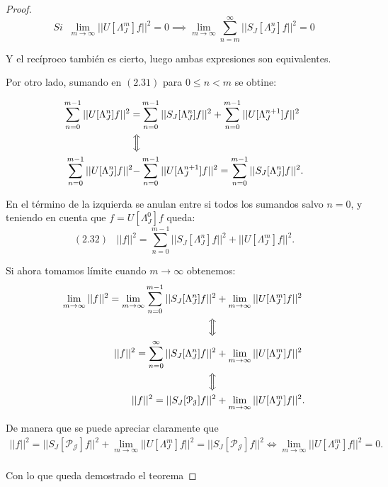 \begin{proof}
  $$Si \; \; \lim_{m\rightarrow \infty} ||U[\Lambda_J^m]f||^2=0 \implies \lim_{m\rightarrow\infty} \sum_{n=m}^{\infty} ||S_J[\Lambda_J^n]f||^2=0$$

  \noindent Y el recíproco también es cierto, luego ambas expresiones son equivalentes.

  \medskip

  \noindent Por otro lado, sumando en $(2.31)$ para $0\leq n < m$ se obtine:

  \begin{align*}
    \sum_{n=0}^{m-1} ||U[\Lambda_J^n]f||^2=&\sum_{n=0}^{m-1} ||S_J[\Lambda_J^n]f||^2 +\sum_{n=0}^{m-1}||U[\Lambda_J^{n+1}]f||^2 \\
    \Big\Updownarrow \\
    \sum_{n=0}^{m-1} ||U[\Lambda_J^n]f||^2 -& \sum_{n=0}^{m-1}||U[\Lambda_J^{n+1}]f||^2 = \sum_{n=0}^{m-1} ||S_J[\Lambda_J^n]f||^2.  \\
  \end{align*}
  
  \noindent En el término de la izquierda se anulan entre si todos los sumandos salvo $n=0$, y teniendo en cuenta que $f=U[\Lambda_J^0]f$ queda:
  $$(2.32) \;\;\; ||f||^2=\sum_{n=0}^{m-1} ||S_J[\Lambda_J^n]f||^2 + ||U[\Lambda_J^m]f||^2.$$

  \noindent Si ahora tomamos límite cuando $m\rightarrow \infty$ obtenemos: 
  \begin{align*}
    \lim_{m\rightarrow \infty}||f||^2 =\lim_{m\rightarrow \infty}\sum_{n=0}^{m-1} ||S_J[\Lambda_J^n]f||^2 &+ \lim_{m\rightarrow \infty} ||U[\Lambda_J^m]f||^2  \\
    \Big\Updownarrow \\
    ||f||^2 =\sum_{n=0}^{\infty} ||S_J[\Lambda_J^n]f||^2 &+ \lim_{m\rightarrow \infty} ||U[\Lambda_J^m]f||^2  \\
    \Big\Updownarrow \\
    ||f||^2 =||S_J[\mathcal{P_J}]f||^2 &+ \lim_{m\rightarrow \infty} ||U[\Lambda_J^m]f||^2.  \\
  \end{align*}

  \noindent De manera que se puede apreciar claramente que  
  \begin{align*}
    ||f||^2 =||S_J[\mathcal{P_J}]f||^2 + \lim_{m\rightarrow \infty} ||U[\Lambda_J^m]f||^2  = ||S_J[\mathcal{P_J}]f||^2 \iff \lim_{m\rightarrow \infty} ||U[\Lambda_J^m]f||^2=0. \\
  \end{align*}

  \noindent Con lo que queda demostrado el teorema \qedhere
\end{proof}

